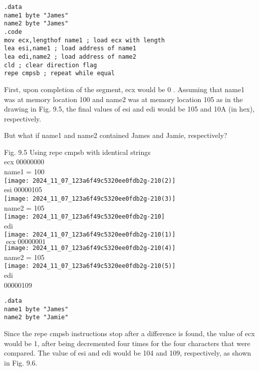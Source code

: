 \documentclass[10pt]{article}
\begin{document}
\begin{verbatim}
.data
name1 byte "James"
name2 byte "James"
.code
mov ecx,lengthof name1 ; load ecx with length
lea esi,name1 ; load address of name1
lea edi,name2 ; load address of name2
cld ; clear direction flag
repe cmpsb ; repeat while equal
\end{verbatim}

First, upon completion of the segment, ecx would be 0 . Assuming that name1 was at memory location 100 and name2 was at memory location 105 as in the drawing in Fig. 9.5, the final values of esi and edi would be 105 and 10A (in hex), respectively.

But what if name1 and name2 contained James and Jamie, respectively?

Fig. 9.5 Using repe cmpsb with identical strings\\
ecx 00000000\\
name1 = 100\\
\texttt{[image: 2024\_11\_07\_123a6f49c5320ee0fdb2g-210(2)]}\\
esi 00000105\\
\texttt{[image: 2024\_11\_07\_123a6f49c5320ee0fdb2g-210(3)]}\\
name2 = 105\\
\texttt{[image: 2024\_11\_07\_123a6f49c5320ee0fdb2g-210]}\\
edi\\
\texttt{[image: 2024\_11\_07\_123a6f49c5320ee0fdb2g-210(1)]}\\
$\operatorname{ecx} 00000001$\\
\texttt{[image: 2024\_11\_07\_123a6f49c5320ee0fdb2g-210(4)]}\\
name2 = 105\\
\texttt{[image: 2024\_11\_07\_123a6f49c5320ee0fdb2g-210(5)]}\\
edi\\
00000109

\begin{verbatim}
.data
name1 byte "James"
name2 byte "Jamie"
\end{verbatim}

Since the repe cmpsb instructions stop after a difference is found, the value of ecx would be 1, after being decremented four times for the four characters that were compared. The value of esi and edi would be 104 and 109, respectively, as shown in Fig. 9.6.
\end{document}
